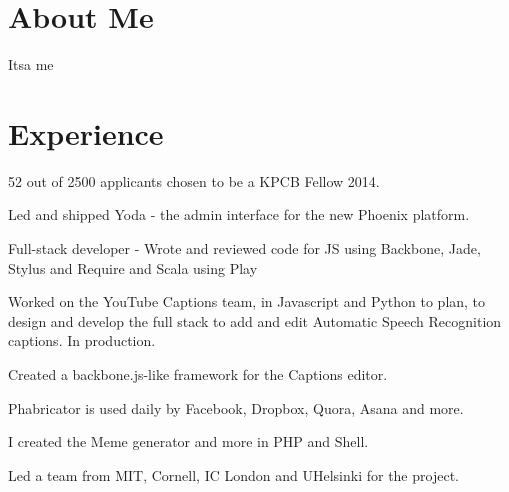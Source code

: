 \documentclass[]{deedy-resume-openfont}
\begin{document}
\begin{minipage}[t]{0.66\textwidth} 


\section{About Me}
Itsa me


\section{Experience}
\sectionsep

\vspace{\topsep} %
\begin{tightemize}
\item 52 out of 2500 applicants chosen to be a KPCB Fellow 2014.
\item Led and shipped Yoda - the admin interface for the new Phoenix platform. 
\item Full-stack developer - Wrote and reviewed code for JS using Backbone, Jade, Stylus and Require and Scala using Play
\end{tightemize}
\sectionsep

\begin{tightemize}
\item Worked on the YouTube Captions team, in Javascript and Python to plan, to design and develop the full stack to add and edit Automatic Speech Recognition captions. In production.
\item Created a backbone.js-like framework for the Captions editor.
\end{tightemize}
\sectionsep

\begin{tightemize}
\item Phabricator is used daily by Facebook, Dropbox, Quora, Asana and more.
\item I created the Meme generator and more in PHP and Shell.
\item Led a team from MIT, Cornell, IC London and UHelsinki for the project.
\end{tightemize}


\end{minipage}
\end{document}

